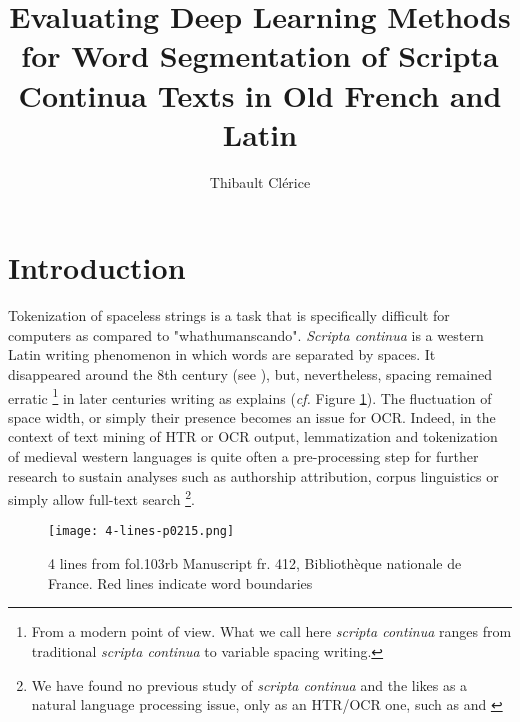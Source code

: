 \documentclass{jdmdh}
\title{Evaluating Deep Learning Methods for Word Segmentation of Scripta Continua Texts in Old French and Latin}
\author[1]{Thibault Clérice}
\affil[1]{École nationale des Chartes, France}
\affil[2]{Université Lyon 3, France}
\begin{document}
\maketitle



\section{Introduction}

Tokenization of spaceless strings is a task that is specifically difficult for computers as compared to "whathumanscando". \textit{Scripta continua} is a western Latin writing phenomenon in which words are separated by spaces. It disappeared around the 8th century (see \citet{zanna1998lecture}), but, nevertheless, spacing remained erratic \footnote{From a modern point of view. What we call here \textit{scripta continua} ranges from traditional \textit{scripta continua} to variable spacing writing.} in later centuries writing as \citet{stutzmann} explains (\textit{cf.} Figure \ref{fig:4lines}). The fluctuation of space width, or simply their presence becomes an issue for OCR. Indeed, in the context of text mining of HTR or OCR output, lemmatization and tokenization of medieval western languages is quite often a pre-processing step for further research to sustain analyses such as authorship attribution, corpus linguistics or simply allow full-text search \footnote{We have found no previous study of \textit{scripta continua} and the likes as a natural language processing issue, only as an HTR/OCR one, such as \cite{wahlberg2014spotting} and \cite{8269990}}.

\begin{figure}[!ht]
  \centering
  \texttt{[image: 4-lines-p0215.png]}

  \caption{ 4 lines from fol.103rb Manuscript fr. 412, Bibliothèque nationale de France.  Red lines indicate word boundaries}
  \label{fig:4lines}
\end{figure}
\end{document}
